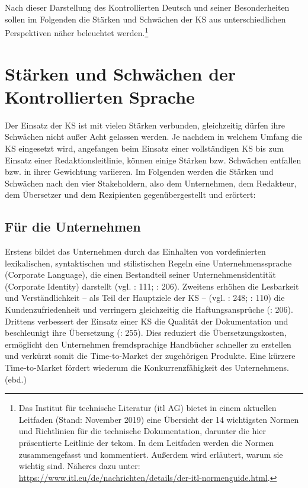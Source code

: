 Nach dieser Darstellung des Kontrollierten Deutsch und seiner Besonderheiten sollen im Folgenden die Stärken und Schwächen der KS aus unterschiedlichen Perspektiven näher beleuchtet werden.\footnote{{{{Das Institut für technische Literatur (itl AG) bietet in einem aktuellen Leitfaden (Stand: November 2019) eine Übersicht der 14 wichtigsten Normen und Richtlinien für die technische Dokumentation, darunter die hier präsentierte Leitlinie der tekom. In dem Leitfaden werden die Normen zusammengefasst und kommentiert. Außerdem wird erläutert, warum sie wichtig sind. Näheres dazu unter: \url{https://www.itl.eu/de/nachrichten/details/der-itl-normenguide.html}.}}}}


\section{\label{sec:2.4}Stärken und Schwächen der Kontrollierten Sprache}

Der Einsatz der KS ist mit vielen Stärken verbunden, gleichzeitig dürfen ihre Schwächen nicht außer Acht gelassen werden. Je nachdem in welchem Umfang die KS eingesetzt wird, angefangen beim Einsatz einer vollständigen KS bis zum Einsatz einer Redaktionsleitlinie, können einige Stärken bzw. Schwächen entfallen bzw. in ihrer Gewichtung variieren. Im Folgenden werden die Stärken und Schwächen nach den vier Stakeholdern, also dem Unternehmen, dem Redakteur, dem Übersetzer und dem Rezipienten gegenübergestellt und erörtert:

\subsection{Für die Unternehmen}

Erstens bildet das Unternehmen durch das Einhalten von vordefinierten lexikalischen, syntaktischen und stilistischen Regeln eine Unternehmenssprache (Corporate Language), die einen Bestandteil seiner Unternehmensidentität (Corporate Identity) darstellt (vgl. \citealt{LehrndorferReuther2008}: 111; \citealt{DrewerZiegler2014}: 206). Zweitens erhöhen die Lesbarkeit und Verständlichkeit – als Teil der Hauptziele der KS – (vgl. \citealt{NybergEtAl2003}: 248; \citealt{LehrndorferReuther2008}: 110) die Kundenzufriedenheit und verringern gleichzeitig die Haftungsansprüche (\citealt{DrewerZiegler2014}: 206). Drittens verbessert der Einsatz einer KS die Qualität der Dokumentation und beschleunigt ihre Übersetzung (\citealt{NybergEtAl2003}: 255). Dies reduziert die Übersetzungskosten, ermöglicht den Unternehmen fremdsprachige Handbücher schneller zu erstellen und verkürzt somit die Time-to-Market der zugehörigen Produkte. Eine kürzere Time-to-Market fördert wiederum die Konkurrenzfähigkeit des Unternehmens. (ebd.)


